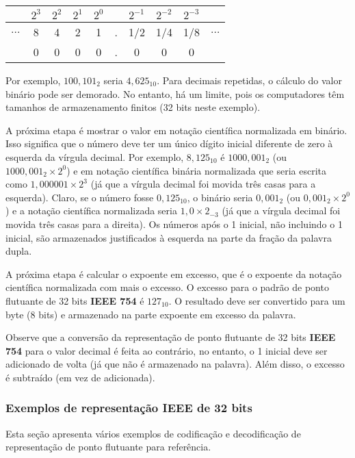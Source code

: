\vspace{5mm}
\begin{center}
	\begin{tabular}{|c|c|c|c|c|c|c|c|c|c|}
	\hline
	         &$2^3$& $2^2$ & $2^1$ & $2^0$ & & $2^{-1}$  & $2^{-2}$ & $2^{-3}$ & \\ \hline
	$\ldots$ & 8   & 4     & 2     & 1     &.& 1/2       &  1/4     & 1/8 & $\ldots$\\ \hline
	         & 0   & 0     & 0     & 0     &.& 0         &  0     & 0 & \\ \hline
\end{tabular}
\end{center}
\vspace{5mm}

Por exemplo, $ 100,101_2 $ seria $ 4,625_{10} $. Para decimais repetidas, o cálculo do valor binário pode ser demorado. No entanto, há um limite, pois os computadores têm tamanhos de armazenamento finitos (32 bits neste exemplo).

A próxima etapa é mostrar o valor em notação científica normalizada em binário. Isso significa que o número deve ter um único dígito inicial diferente de zero à esquerda da vírgula decimal. Por exemplo, $ 8,125_{10} $ é $ 1000,001_2 $ (ou $ 1000,001_2 \times 2^0$) e em notação científica binária normalizada que seria escrita como $ 1,000001 \times 2^3 $ (já que a vírgula decimal foi movida três casas para a esquerda). Claro, se o número fosse $ 0,125_{10} $, o binário seria $ 0,001_2 $ (ou $ 0,001_2 \times 2^0 $) e a notação científica normalizada seria $ 1,0 \times 2_{-3} $ (já que a vírgula decimal foi movida três casas para a direita). Os números após o 1 inicial, não incluindo o 1 inicial, são armazenados justificados à esquerda na parte da fração da palavra dupla.

A próxima etapa é calcular o expoente em excesso, que é o expoente da notação científica normalizada com mais o excesso. O excesso para o padrão de ponto flutuante de 32 bits \textbf{IEEE 754} é $ 127_{10} $. O resultado deve ser convertido para um byte (8 bits) e armazenado na parte expoente em excesso da palavra.

Observe que a conversão da representação de ponto flutuante de 32 bits \textbf{IEEE 754} para o valor decimal é feita ao contrário, no entanto, o 1 inicial deve ser adicionado de volta (já que não é armazenado na palavra). Além disso, o excesso é subtraído (em vez de adicionada).

\subsubsection{Exemplos de representação IEEE de 32 bits}
Esta seção apresenta vários exemplos de codificação e decodificação de representação de ponto flutuante para referência.


